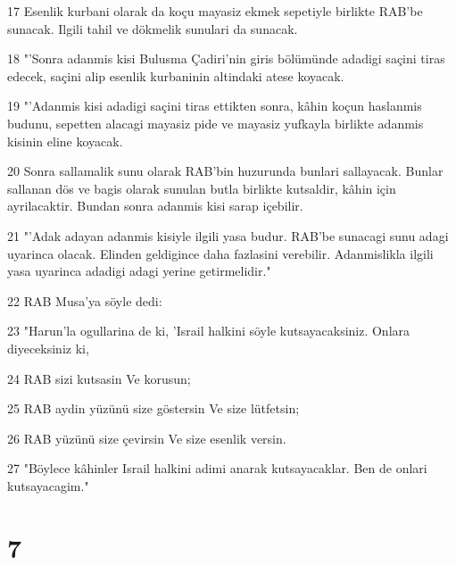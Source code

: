 \par 17 Esenlik kurbani olarak da koçu mayasiz ekmek sepetiyle birlikte RAB'be sunacak. Ilgili tahil ve dökmelik sunulari da sunacak.
\par 18 "'Sonra adanmis kisi Bulusma Çadiri'nin giris bölümünde adadigi saçini tiras edecek, saçini alip esenlik kurbaninin altindaki atese koyacak.
\par 19 "'Adanmis kisi adadigi saçini tiras ettikten sonra, kâhin koçun haslanmis budunu, sepetten alacagi mayasiz pide ve mayasiz yufkayla birlikte adanmis kisinin eline koyacak.
\par 20 Sonra sallamalik sunu olarak RAB'bin huzurunda bunlari sallayacak. Bunlar sallanan dös ve bagis olarak sunulan butla birlikte kutsaldir, kâhin için ayrilacaktir. Bundan sonra adanmis kisi sarap içebilir.
\par 21 "'Adak adayan adanmis kisiyle ilgili yasa budur. RAB'be sunacagi sunu adagi uyarinca olacak. Elinden geldigince daha fazlasini verebilir. Adanmislikla ilgili yasa uyarinca adadigi adagi yerine getirmelidir."
\par 22 RAB Musa'ya söyle dedi:
\par 23 "Harun'la ogullarina de ki, 'Israil halkini söyle kutsayacaksiniz. Onlara diyeceksiniz ki,
\par 24 RAB sizi kutsasin Ve korusun;
\par 25 RAB aydin yüzünü size göstersin Ve size lütfetsin;
\par 26 RAB yüzünü size çevirsin Ve size esenlik versin.
\par 27 "Böylece kâhinler Israil halkini adimi anarak kutsayacaklar. Ben de onlari kutsayacagim."

\chapter{7}

